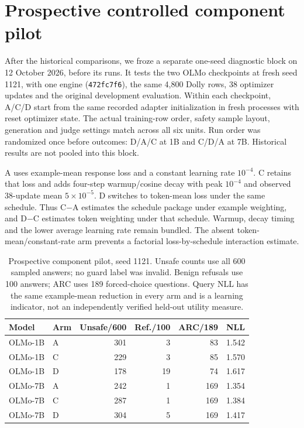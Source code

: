 \documentclass{article}
\begin{document}
\FloatBarrier
\section{Prospective controlled component pilot}
\label{app:components}

After the historical comparisons, we froze a separate one-seed diagnostic
block on 12 October 2026, before its runs. It tests the two OLMo checkpoints
at fresh seed 1121, with one engine (\texttt{472fc7f6}), the same 4,800 Dolly
rows, 38 optimizer updates and the original development evaluation. Within
each checkpoint, A/C/D start from the same recorded adapter initialization
in fresh processes with reset optimizer state. The actual training-row order,
safety sample layout, generation and judge settings match across all six
units. Run order was randomized once before outcomes: D/A/C at 1B and C/D/A
at 7B. Historical results are not pooled into this block.

A uses example-mean response loss and a constant learning rate $10^{-4}$.
C retains that loss and adds four-step warmup/cosine decay with peak
$10^{-4}$ and observed 38-update mean $5\times10^{-5}$. D switches to
token-mean loss under the same schedule. Thus C$-$A estimates the schedule
package under example weighting, and D$-$C estimates token weighting under
that schedule. Warmup, decay timing and the lower average learning rate
remain bundled. The absent token-mean/constant-rate arm prevents a factorial
loss-by-schedule interaction estimate.

\begin{table}[t]
  \caption{Prospective component pilot, seed 1121. Unsafe counts use all
    600 sampled answers; no guard label was invalid. Benign refusals use
    100 answers; ARC uses 189 forced-choice questions. Query NLL has the
    same example-mean reduction in every arm and is a learning indicator,
    not an independently verified held-out utility measure.}
  \label{tab:components}
  \centering\footnotesize
  \setlength{\tabcolsep}{3pt}
  \begin{tabular}{@{}llrrrr@{}}
    \toprule
    Model & Arm & Unsafe/600 & Ref./100 & ARC/189 & NLL \\
    \midrule
    OLMo-1B & A & 301 & 3 & 83 & 1.542 \\
    OLMo-1B & C & 229 & 3 & 85 & 1.570 \\
    OLMo-1B & D & 178 & 19 & 74 & 1.617 \\
    OLMo-7B & A & 242 & 1 & 169 & 1.354 \\
    OLMo-7B & C & 287 & 1 & 169 & 1.384 \\
    OLMo-7B & D & 304 & 5 & 169 & 1.417 \\
    \bottomrule
  \end{tabular}
\end{table}
\end{document}
